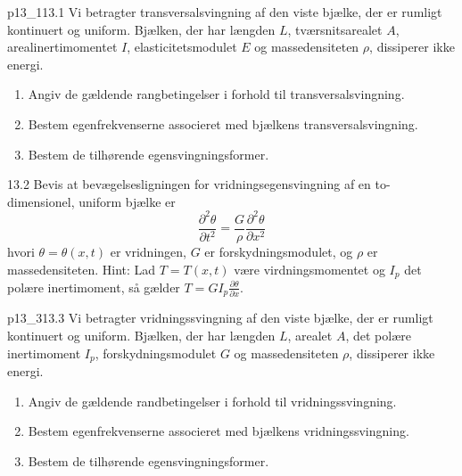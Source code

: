
\begin{problemwithimage}{p13_1}{13.1}
  Vi betragter transversalsvingning af den viste bjælke, der er rumligt kontinuert og uniform.
  Bjælken, der har længden $L$, tværsnitsarealet $A$, arealinertimomentet $I$, elasticitetsmodulet $E$ og massedensiteten $\rho$, dissiperer ikke energi.
  \begin{enumerate}[label=\alph*)]
    \item Angiv de gældende rangbetingelser i forhold til transversalsvingning.
    \item Bestem egenfrekvenserne associeret med bjælkens transversalsvingning.
    \item Bestem de tilhørende egensvingningsformer.
  \end{enumerate}
\end{problemwithimage}

\begin{problem}{13.2}
  Bevis at bevægelsesligningen for vridningsegensvingning af en to-dimensionel, uniform bjælke er
  \begin{equation*}
    \frac{\partial ^2 \theta}{\partial t^2}  = \frac{G}{\rho} \frac{\partial ^2 \theta}{\partial x^2} 
  \end{equation*}
  hvori $\theta = \theta(x,t)$ er vridningen, $G$ er forskydningsmodulet, og $\rho$ er massedensiteten.
  Hint: Lad $T = T(x,t)$ være virdningsmomentet og $I_p$ det polære inertimoment, så gælder $T = GI_p \frac{\partial \theta}{\partial x} $.
\end{problem}

\begin{problemwithimage}{p13_3}{13.3}
  Vi betragter vridningssvingning af den viste bjælke, der er rumligt kontinuert og uniform.
  Bjælken, der har længden $L$, arealet $A$, det polære inertimoment $I_p$, forskydningsmodulet $G$ og massedensiteten $\rho$, dissiperer ikke energi.

  \begin{enumerate}[label=\alph*)]
    \item Angiv de gældende randbetingelser i forhold til vridningssvingning.
    \item Bestem egenfrekvenserne associeret med bjælkens vridningssvingning.
    \item Bestem de tilhørende egensvingningsformer.
  \end{enumerate}
\end{problemwithimage}
